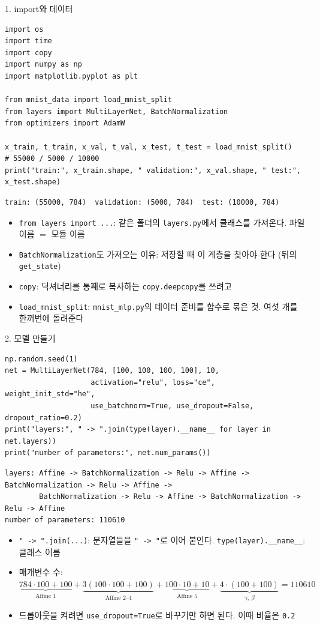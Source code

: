 \documentclass[aspectratio=169,11pt]{beamer}
\newcommand{\codetiny}{\ttfamily\fontsize{6.8}{7.6}\selectfont}
\newcommand{\code}[1]{\texttt{#1}}
\begin{document}
\begin{frame}[fragile]{1. import와 데이터}
\footnotesize
\begin{lstlisting}[basicstyle=\codetiny]
import os
import time
import copy
import numpy as np
import matplotlib.pyplot as plt

from mnist_data import load_mnist_split
from layers import MultiLayerNet, BatchNormalization
from optimizers import AdamW

x_train, t_train, x_val, t_val, x_test, t_test = load_mnist_split()   # 55000 / 5000 / 10000
print("train:", x_train.shape, " validation:", x_val.shape, " test:", x_test.shape)
\end{lstlisting}
\begin{lstlisting}[style=outstyle,basicstyle=\codetiny]
train: (55000, 784)  validation: (5000, 784)  test: (10000, 784)
\end{lstlisting}
\begin{itemize}
\item \code{from layers import ...}: 같은 폴더의 \code{layers.py}에서 클래스를 가져온다. 파일 이름 $=$ 모듈 이름
\item \code{BatchNormalization}도 가져오는 이유: 저장할 때 이 계층을 찾아야 한다 (뒤의 \code{get\_state})
\item \code{copy}: 딕셔너리를 통째로 복사하는 \code{copy.deepcopy}를 쓰려고
\item \code{load\_mnist\_split}: \code{mnist\_mlp.py}의 데이터 준비를 함수로 묶은 것. 여섯 개를 한꺼번에 돌려준다
\end{itemize}
\end{frame}

\begin{frame}[fragile]{2. 모델 만들기}
\begin{lstlisting}
np.random.seed(1)
net = MultiLayerNet(784, [100, 100, 100, 100], 10,
                    activation="relu", loss="ce", weight_init_std="he",
                    use_batchnorm=True, use_dropout=False, dropout_ratio=0.2)
print("layers:", " -> ".join(type(layer).__name__ for layer in net.layers))
print("number of parameters:", net.num_params())
\end{lstlisting}
\begin{lstlisting}[style=outstyle,basicstyle=\codetiny]
layers: Affine -> BatchNormalization -> Relu -> Affine -> BatchNormalization -> Relu -> Affine ->
        BatchNormalization -> Relu -> Affine -> BatchNormalization -> Relu -> Affine
number of parameters: 110610
\end{lstlisting}
\small
\begin{itemize}
\item \code{" -> ".join(...)}: 문자열들을 \code{" -> "}로 이어 붙인다. \code{type(layer).\_\_name\_\_}: 클래스 이름
\item 매개변수 수: \
$\underbrace{784\cdot100+100}_{\text{Affine 1}}+\underbrace{3(100\cdot100+100)}_{\text{Affine 2--4}}+\underbrace{100\cdot10+10}_{\text{Affine 5}}+\underbrace{4\cdot(100+100)}_{\gamma,\ \beta}=110610$
\item 드롭아웃을 켜려면 \code{use\_dropout=True}로 바꾸기만 하면 된다. 이때 비율은 \code{0.2}
\end{itemize}
\end{frame}
\end{document}
